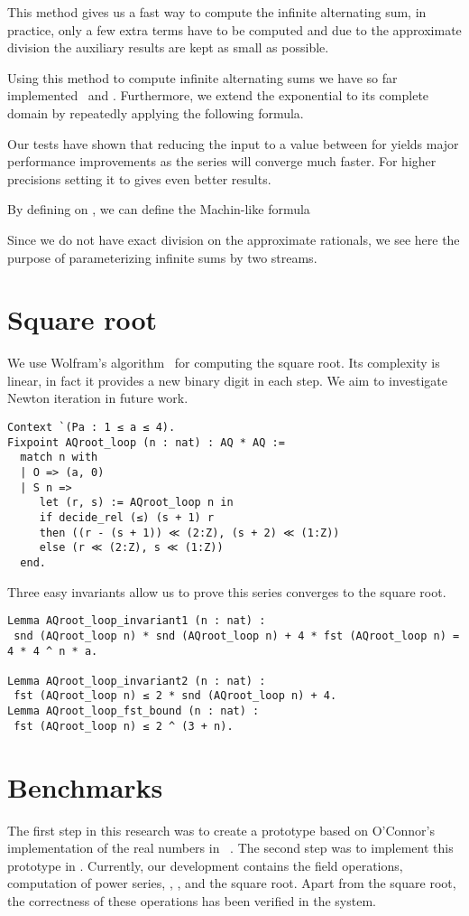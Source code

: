 \documentclass[a4paper,10pt,runningheads]{llncs}
\begin{document}
This method gives us a fast way to compute the infinite alternating sum, in practice, only a few extra terms have to be computed and due to the approximate division the auxiliary results are kept as small as possible.

Using this method to compute infinite alternating sums we have so far implemented \exp\ and \arctan. Furthermore, we extend the exponential to its complete domain by repeatedly applying the following formula.

Our tests have shown that reducing the input to a value between  for  yields major performance improvements as the series will converge much faster. For higher precisions setting it to  gives even better results.

By defining  on , we can define the Machin-like formula

Since we do not have exact division on the approximate rationals, we see here the purpose of parameterizing infinite sums by two streams.

\section{Square root}\label{section:Wolfram}
We use Wolfram's algorithm~\cite[p.913]{wolfram2002new} for computing the square root. Its complexity is linear, in fact it provides a new binary digit in each step. We aim to investigate Newton iteration in future work.
\begin{lstlisting}
Context `(Pa : 1 ≤ a ≤ 4).
Fixpoint AQroot_loop (n : nat) : AQ * AQ :=
  match n with
  | O => (a, 0)
  | S n =>
     let (r, s) := AQroot_loop n in
     if decide_rel (≤) (s + 1) r
     then ((r - (s + 1)) ≪ (2:Z), (s + 2) ≪ (1:Z))
     else (r ≪ (2:Z), s ≪ (1:Z))
  end.
\end{lstlisting}
Three easy invariants allow us to prove this series converges to the square root.
\begin{lstlisting}
Lemma AQroot_loop_invariant1 (n : nat) :
 snd (AQroot_loop n) * snd (AQroot_loop n) + 4 * fst (AQroot_loop n) = 4 * 4 ^ n * a.

Lemma AQroot_loop_invariant2 (n : nat) :
 fst (AQroot_loop n) ≤ 2 * snd (AQroot_loop n) + 4.
Lemma AQroot_loop_fst_bound (n : nat) :
 fst (AQroot_loop n) ≤ 2 ^ (3 + n).
\end{lstlisting}
 


\section{Benchmarks}\label{section:bench}
The first step in this research was to create a \Haskell{} prototype based on O'Connor's implementation of the real numbers in \Haskell~\cite{OConnor:mscs}. The second step was to implement this prototype in \Coq. Currently, our \Coq{} development contains the field operations, computation of power series, \exp, \arctan,  and the square root. Apart from the square root, the correctness of these operations has been verified in the \Coq{} system.
\end{document}
